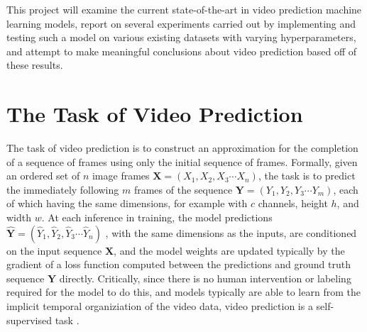\documentclass{scrartcl}
\begin{document}
This project will examine the current state-of-the-art in video prediction
machine learning models, report on several experiments carried out by
implementing and testing such a model on various existing datasets with varying
hyperparameters, and attempt to make meaningful conclusions about video
prediction based off of these results.

\section{The Task of Video Prediction}
\label{sec:task}

\newcommand{\Xseq}{$\boldsymbol{X} = \left( X_1 , X_2 , X_3 \cdots X_n \right)$}
\newcommand{\Yseq}{$\boldsymbol{Y} = \left( Y_1 , Y_2 , Y_3 \cdots Y_m \right)$}
\newcommand{\Yhatseq}{
	$\hat{\boldsymbol{Y}} = 
	\left( \hat{Y}_1 , \hat{Y}_2 , \hat{Y}_3 \cdots \hat{Y}_n \right)$
}

The task of video prediction is to construct an approximation for the
completion of a sequence of frames using only the initial sequence of frames.
Formally, given an ordered set of $n$ image frames \Xseq, the task is to
predict the immediately following $m$ frames of the sequence \Yseq, each of
which having the same dimensions, for example with $c$ channels, height $h$,
and width $w$. At each inference in training, the model predictions \Yhatseq,
with the same dimensions as the inputs, are conditioned on the input sequence
$\boldsymbol{X}$, and the model weights are updated typically by the gradient
of a loss function computed between the predictions and ground truth sequence
$\boldsymbol{Y}$ directly. Critically, since there is no human intervention or
labeling required for the model to do this, and models typically are able to
learn from the implicit temporal organiziation of the video data, video
prediction is a self-supervised task \cite{video_prediction_survey}.

\end{document}

